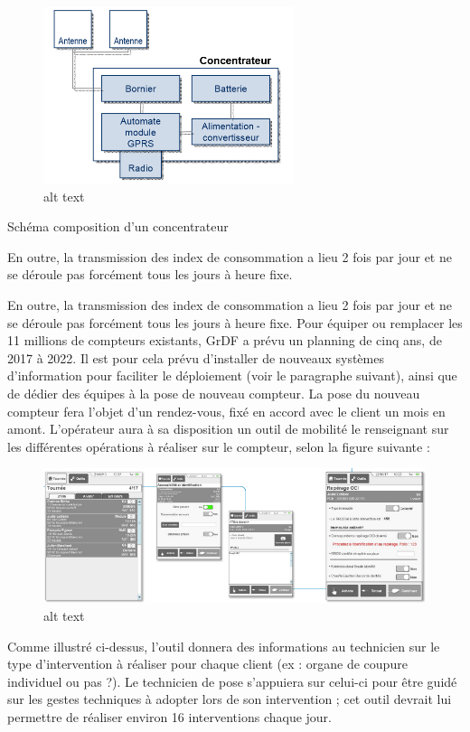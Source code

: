 \documentclass[
12pt,
french,                           %
a4paper,
]{article}
\begin{document}
\begin{figure}[htbp]
\centering
\includegraphics{compositionconcentrateur.png}
\caption{alt text}
\end{figure}

Schéma composition d'un concentrateur

En outre, la transmission des index de consommation a lieu 2 fois par
jour et ne se déroule pas forcément tous les jours à heure fixe.

En outre, la transmission des index de consommation a lieu 2 fois par
jour et ne se déroule pas forcément tous les jours à heure fixe. Pour
équiper ou remplacer les 11 millions de compteurs existants, GrDF a
prévu un planning de cinq ans, de 2017 à 2022. Il est pour cela prévu
d'installer de nouveaux systèmes d'information pour faciliter le
déploiement (voir le paragraphe suivant), ainsi que de dédier des
équipes à la pose de nouveau compteur. La pose du nouveau compteur fera
l'objet d'un rendez-vous, fixé en accord avec le client un mois en
amont. L'opérateur aura à sa disposition un outil de mobilité le
renseignant sur les différentes opérations à réaliser sur le compteur,
selon la figure suivante :

\begin{figure}[htbp]
\centering
\includegraphics{outil.png}
\caption{alt text}
\end{figure}

Comme illustré ci-dessus, l'outil donnera des informations au technicien
sur le type d'intervention à réaliser pour chaque client (ex : organe de
coupure individuel ou pas ?). Le technicien de pose s'appuiera sur
celui-ci pour être guidé sur les gestes techniques à adopter lors de son
intervention ; cet outil devrait lui permettre de réaliser environ 16
interventions chaque jour.
\end{document}
